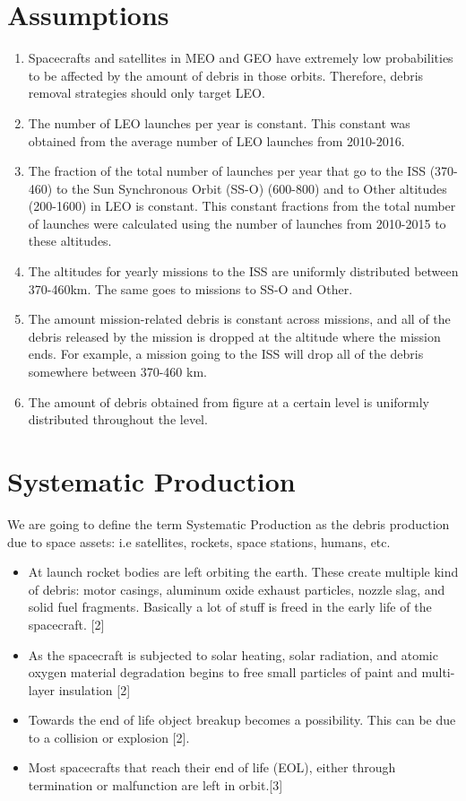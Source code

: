 \documentclass{article}
\theoremstyle{definition}
\begin{document}
\begin{enumerat}
\section*{Assumptions}
\begin{enumerate}
  \item Spacecrafts and satellites in MEO and GEO have extremely low probabilities to be affected by the amount of debris in those orbits. Therefore, debris removal strategies should only target LEO.
  \item The number of LEO launches per year is constant. This constant was obtained from the average number of LEO launches from 2010-2016.
  \item The fraction of the total number of launches per year that go to the ISS (370-460) to the Sun Synchronous Orbit (SS-O) (600-800) and to Other altitudes (200-1600) in  LEO is constant. This constant fractions from the total number of launches were calculated using the number of launches from 2010-2015 to these altitudes.
  \item The altitudes for yearly missions to the ISS are uniformly distributed between 370-460km. The same goes to missions to SS-O and Other.
  \item The amount mission-related debris is constant across missions, and all of the debris released by the mission is dropped at the altitude where the mission ends. For example, a mission going to the ISS will drop all of the debris somewhere between 370-460 km.
  \item The amount of debris obtained from figure  at a certain level is uniformly distributed throughout the level. 
  

\end{enumerate}
\section*{Systematic Production}

We are going to define the term Systematic Production  as the debris production due to space assets: i.e satellites, rockets, space stations, humans, etc.

\begin{itemize}
  \item At launch rocket bodies are left orbiting the earth. These create multiple kind of debris: motor casings, aluminum oxide exhaust particles, nozzle slag, and solid fuel fragments. Basically a lot of stuff is freed in the early life of the spacecraft. [2]
  \item As the spacecraft is subjected to solar heating, solar radiation, and atomic oxygen material degradation begins to free small particles of paint and multi-layer insulation [2]
  \item Towards the end of life object breakup becomes a possibility. This can be due to a collision or explosion [2].
  \item Most spacecrafts that reach their end of life (EOL), either through termination or malfunction are left in orbit.[3]
\end{itemize}


\end{enumerat}
\end{document}
